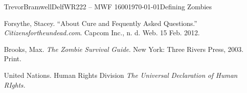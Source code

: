 \documentclass[12pt,letterpaper]{article}
\begin{document}
\begin{mla}{Trevor}{Bramwell}{Delf}{WR222 -- MWF 1600}{\today}{Defining Zombies}
\begin{workscited}
\bibent
Forsythe, Stacey. ``About Cure and Fequently Asked Questions.'' \emph{Citizensfortheundead.com}. Capcom Inc., n. d. Web. 15 Feb. 2012.

\bibent
Brooks, Max. \emph{The Zombie Survival Guide}. New York: Three Rivers Press,
2003. Print.

\bibent
United Nations. Human Rights Division \emph{The Universal Declaration of Human RIghts.} 
\end{workscited}
\end{mla}
\end{document}
